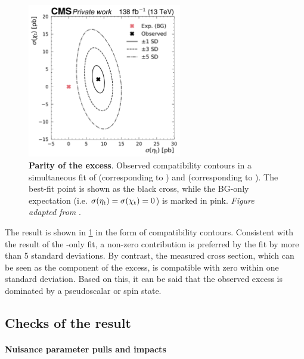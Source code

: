 \begin{figure}[th]
    \centering
    \includegraphics[width=0.6\textwidth]{figures/ah/etatfit/A_m365_w2p0__H_m365_w2p0_nll_CMS_EtaT_norm_13TeV__CMS_ChiT_norm_13TeV_ll.pdf}
    \caption{
        \textbf{Parity of the excess}. Observed compatibility contours in a simultaneous fit of \etat (corresponding to ) and \chit (corresponding to ). The best-fit point is shown as the black cross, while the BG-only expectation (i.e. $\sigma(\mathrm{\eta_t})=\sigma(\mathrm{\chi_t})=0$) is marked in pink. \textit{Figure adapted from }.
    }
    \label{fig:ah:parityscan}
\end{figure}

The result is shown in \cref{fig:ah:parityscan} in the form of compatibility contours. Consistent with the result of the \etat-only fit, a non-zero \etat contribution is preferred by the fit by more than 5 standard deviations. By contrast, the measured \chit cross section, which can be seen as the  component of the excess, is compatible with zero within one standard deviation. Based on this, it can be said that the observed excess is dominated by a pseudoscalar or  spin state.

\subsection{Checks of the result}
\label{sec:ah:checks}

\paragraph{Nuisance parameter pulls and impacts}

